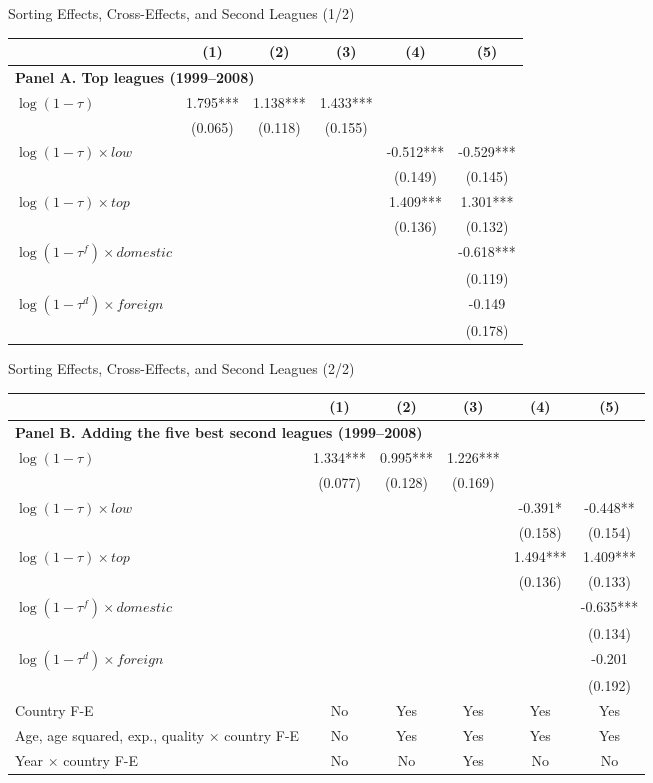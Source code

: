 \documentclass[aspectratio=169,professionalfonts]{beamer}
\begin{document}
\begin{frame}{Sorting Effects, Cross-Effects, and Second Leagues (1/2)}
  \scriptsize
  \centering

  \begin{tabular}{lccccc}
    \toprule
    & (1) & (2) & (3) & (4) & (5) \\
    \midrule
    \multicolumn{6}{l}{\textbf{Panel A. Top leagues (1999--2008)}} \\
    $\log(1-\tau)$
    & 1.795*** & 1.138*** & 1.433*** &  &  \\
    & (0.065) & (0.118) & (0.155) &  &  \\
    $\log(1-\tau)\times low$
    &  &  &  & -0.512*** & -0.529*** \\
    &  &  &  & (0.149) & (0.145) \\
    $\log(1-\tau)\times top$
    &  &  &  & 1.409*** & 1.301*** \\
    &  &  &  & (0.136) & (0.132) \\
    $\log(1-\tau^f)\times domestic$
    &  &  &  &  & -0.618*** \\
    &  &  &  &  & (0.119) \\
    $\log(1-\tau^d)\times foreign$
    &  &  &  &  & -0.149 \\
    &  &  &  &  & (0.178) \\
    \bottomrule
  \end{tabular}
\end{frame}


\begin{frame}{Sorting Effects, Cross-Effects, and Second Leagues (2/2)}
  \scriptsize
  \centering
  \begin{tabular}{lccccc}
  \toprule
  & (1) & (2) & (3) & (4) & (5) \\
  \midrule
  \multicolumn{6}{l}{\textbf{Panel B. Adding the five best second leagues (1999--2008)}} \\
  $\log(1-\tau)$
  & 1.334*** & 0.995*** & 1.226*** &  &  \\
  & (0.077) & (0.128) & (0.169) &  &  \\
  $\log(1-\tau)\times low$
  &  &  &  & -0.391* & -0.448** \\
  &  &  &  & (0.158) & (0.154) \\
  $\log(1-\tau)\times top$
  &  &  &  & 1.494*** & 1.409*** \\
  &  &  &  & (0.136) & (0.133) \\
  $\log(1-\tau^f)\times domestic$
  &  &  &  &  & -0.635*** \\
  &  &  &  &  & (0.134) \\
  $\log(1-\tau^d)\times foreign$
  &  &  &  &  & -0.201 \\
  &  &  &  &  & (0.192) \\
  \addlinespace
  Country F-E
  & No & Yes & Yes & Yes & Yes \\
  Age, age squared, exp., quality $\times$ country F-E
  & No & Yes & Yes & Yes & Yes \\
  Year $\times$ country F-E
  & No & No & Yes & No & No \\
  \bottomrule
  \end{tabular}
\end{frame}
\end{document}
